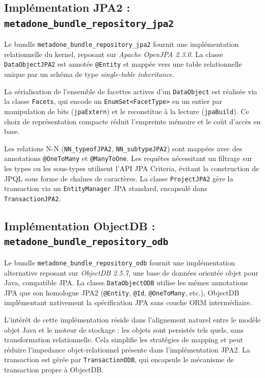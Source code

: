 \subsection{Implémentation JPA2 :
\texttt{metadone\_bundle\_repository\_jpa2}}

Le bundle \texttt{metadone\_bundle\_repository\_jpa2} fournit une
implémentation relationnelle du kernel, reposant sur
\emph{Apache OpenJPA 2.3.0}. La classe \texttt{DataObjectJPA2} est
annotée \texttt{@Entity} et mappée vers une table relationnelle unique par
un schéma de type \emph{single-table inheritance}.

La sérialisation de l'ensemble de facettes actives d'un
\texttt{DataObject} est réalisée via la classe \texttt{Facets}, qui
encode un \texttt{EnumSet<FacetType>} en un entier par manipulation de
bits (\texttt{jpaExtern}) et le reconstitue à la lecture
(\texttt{jpaBuild}). Ce choix de représentation compacte réduit
l'empreinte mémoire et le coût d'accès en base.

Les relations N-N (\texttt{NN\_typeofJPA2}, \texttt{NN\_subtypeJPA2})
sont mappées avec des annotations \texttt{@OneToMany} et
\texttt{@ManyToOne}. Les requêtes nécessitant un filtrage sur les types
ou les sous-types utilisent l'API JPA Criteria, évitant la construction
de JPQL sous forme de chaînes de caractères. La classe
\texttt{ProjectJPA2} gère la transaction via un \texttt{EntityManager}
JPA standard, encapsulé dans \texttt{TransactionJPA2}.

\subsection{Implémentation ObjectDB :
\texttt{metadone\_bundle\_repository\_odb}}

Le bundle \texttt{metadone\_bundle\_repository\_odb} fournit une
implémentation alternative reposant sur \emph{ObjectDB 2.5.7}, une base
de données orientée objet pour Java, compatible JPA. La classe
\texttt{DataObjectODB} utilise les mêmes annotations JPA que son
homologue JPA2 (\texttt{@Entity}, \texttt{@Id}, \texttt{@OneToMany},
etc.), ObjectDB implémentant nativement la spécification JPA sans couche
ORM intermédiaire.

L'intérêt de cette implémentation réside dans l'alignement naturel entre
le modèle objet Java et le moteur de stockage : les objets sont persistés
tels quels, sans transformation relationnelle. Cela simplifie les
stratégies de mapping et peut réduire l'impedance objet-relationnel
présente dans l'implémentation JPA2. La transaction est gérée par
\texttt{TransactionODB}, qui encapsule le mécanisme de transaction propre
à ObjectDB.

